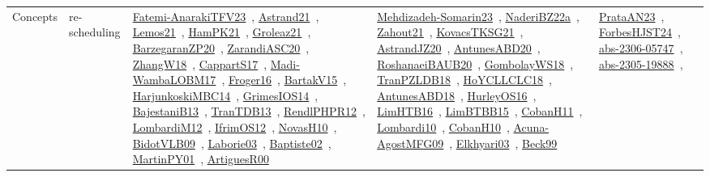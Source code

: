 {\begin{longtable}{lp{3cm}>{\raggedright\arraybackslash}p{6cm}>{\raggedright\arraybackslash}p{6cm}>{\raggedright\arraybackslash}p{8cm}}
Concepts & re-scheduling & \href{../works/Fatemi-AnarakiTFV23.pdf}{Fatemi-AnarakiTFV23}~\cite{Fatemi-AnarakiTFV23}, \href{../works/Astrand21.pdf}{Astrand21}~\cite{Astrand21}, \href{../works/Lemos21.pdf}{Lemos21}~\cite{Lemos21}, \href{../works/HamPK21.pdf}{HamPK21}~\cite{HamPK21}, \href{../works/Groleaz21.pdf}{Groleaz21}~\cite{Groleaz21}, \href{../works/BarzegaranZP20.pdf}{BarzegaranZP20}~\cite{BarzegaranZP20}, \href{../works/ZarandiASC20.pdf}{ZarandiASC20}~\cite{ZarandiASC20}, \href{../works/ZhangW18.pdf}{ZhangW18}~\cite{ZhangW18}, \href{../works/CappartS17.pdf}{CappartS17}~\cite{CappartS17}, \href{../works/Madi-WambaLOBM17.pdf}{Madi-WambaLOBM17}~\cite{Madi-WambaLOBM17}, \href{../works/Froger16.pdf}{Froger16}~\cite{Froger16}, \href{../works/BartakV15.pdf}{BartakV15}~\cite{BartakV15}, \href{../works/HarjunkoskiMBC14.pdf}{HarjunkoskiMBC14}~\cite{HarjunkoskiMBC14}, \href{../works/GrimesIOS14.pdf}{GrimesIOS14}~\cite{GrimesIOS14}, \href{../works/BajestaniB13.pdf}{BajestaniB13}~\cite{BajestaniB13}, \href{../works/TranTDB13.pdf}{TranTDB13}~\cite{TranTDB13}, \href{../works/RendlPHPR12.pdf}{RendlPHPR12}~\cite{RendlPHPR12}, \href{../works/LombardiM12.pdf}{LombardiM12}~\cite{LombardiM12}, \href{../works/IfrimOS12.pdf}{IfrimOS12}~\cite{IfrimOS12}, \href{../works/NovasH10.pdf}{NovasH10}~\cite{NovasH10}, \href{../works/BidotVLB09.pdf}{BidotVLB09}~\cite{BidotVLB09}, \href{../works/Laborie03.pdf}{Laborie03}~\cite{Laborie03}, \href{../works/Baptiste02.pdf}{Baptiste02}~\cite{Baptiste02}, \href{../works/MartinPY01.pdf}{MartinPY01}~\cite{MartinPY01}, \href{../works/ArtiguesR00.pdf}{ArtiguesR00}~\cite{ArtiguesR00} & \href{../works/Mehdizadeh-Somarin23.pdf}{Mehdizadeh-Somarin23}~\cite{Mehdizadeh-Somarin23}, \href{../works/NaderiBZ22a.pdf}{NaderiBZ22a}~\cite{NaderiBZ22a}, \href{../works/Zahout21.pdf}{Zahout21}~\cite{Zahout21}, \href{../works/KovacsTKSG21.pdf}{KovacsTKSG21}~\cite{KovacsTKSG21}, \href{../works/AstrandJZ20.pdf}{AstrandJZ20}~\cite{AstrandJZ20}, \href{../works/AntunesABD20.pdf}{AntunesABD20}~\cite{AntunesABD20}, \href{../works/RoshanaeiBAUB20.pdf}{RoshanaeiBAUB20}~\cite{RoshanaeiBAUB20}, \href{../works/GombolayWS18.pdf}{GombolayWS18}~\cite{GombolayWS18}, \href{../works/TranPZLDB18.pdf}{TranPZLDB18}~\cite{TranPZLDB18}, \href{../works/HoYCLLCLC18.pdf}{HoYCLLCLC18}~\cite{HoYCLLCLC18}, \href{../works/AntunesABD18.pdf}{AntunesABD18}~\cite{AntunesABD18}, \href{../works/HurleyOS16.pdf}{HurleyOS16}~\cite{HurleyOS16}, \href{../works/LimHTB16.pdf}{LimHTB16}~\cite{LimHTB16}, \href{../works/LimBTBB15.pdf}{LimBTBB15}~\cite{LimBTBB15}, \href{../works/CobanH11.pdf}{CobanH11}~\cite{CobanH11}, \href{../works/Lombardi10.pdf}{Lombardi10}~\cite{Lombardi10}, \href{../works/CobanH10.pdf}{CobanH10}~\cite{CobanH10}, \href{../works/Acuna-AgostMFG09.pdf}{Acuna-AgostMFG09}~\cite{Acuna-AgostMFG09}, \href{../works/Elkhyari03.pdf}{Elkhyari03}~\cite{Elkhyari03}, \href{../works/Beck99.pdf}{Beck99}~\cite{Beck99} & \href{../works/PrataAN23.pdf}{PrataAN23}~\cite{PrataAN23}, \href{../works/ForbesHJST24.pdf}{ForbesHJST24}~\cite{ForbesHJST24}, \href{../works/abs-2306-05747.pdf}{abs-2306-05747}~\cite{abs-2306-05747}, \href{../works/abs-2305-19888.pdf}{abs-2305-19888}~\cite{abs-2305-19888}, 
\end{longtable}}
